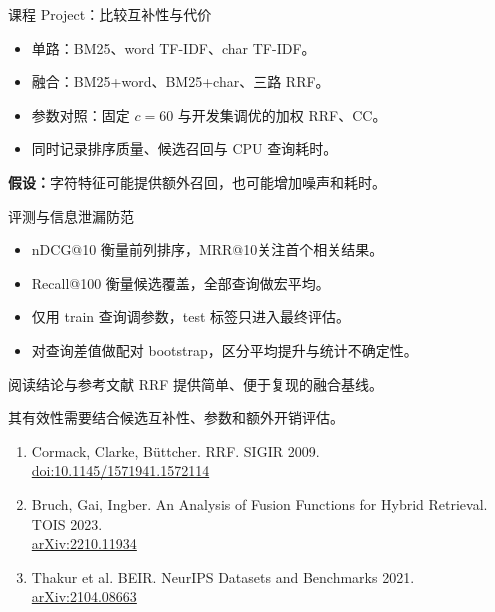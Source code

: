 \documentclass[aspectratio=169,11pt]{beamer}
\begin{document}
\begin{frame}{课程 Project：比较互补性与代价}
\begin{itemize}\setlength\itemsep{0.75em}
\item 单路：BM25、word TF-IDF、char TF-IDF。
\item 融合：BM25+word、BM25+char、三路 RRF。
\item 参数对照：固定 $c=60$ 与开发集调优的加权 RRF、CC。
\item 同时记录排序质量、候选召回与 CPU 查询耗时。
\end{itemize}
\vfill
\textbf{假设：}字符特征可能提供额外召回，也可能增加噪声和耗时。
\end{frame}

\begin{frame}{评测与信息泄漏防范}
\begin{itemize}\setlength\itemsep{0.75em}
\item nDCG@10 衡量前列排序，MRR@10关注首个相关结果。
\item Recall@100 衡量候选覆盖，全部查询做宏平均。
\item 仅用 train 查询调参数，test 标签只进入最终评估。
\item 对查询差值做配对 bootstrap，区分平均提升与统计不确定性。
\end{itemize}
\end{frame}

\begin{frame}{阅读结论与参考文献}
RRF 提供简单、便于复现的融合基线。\par\medskip
其有效性需要结合候选互补性、参数和额外开销评估。
\vfill
\footnotesize
\begin{enumerate}
\item Cormack, Clarke, Büttcher. RRF. SIGIR 2009.\\
\href{https://doi.org/10.1145/1571941.1572114}{doi:10.1145/1571941.1572114}
\item Bruch, Gai, Ingber. An Analysis of Fusion Functions for Hybrid Retrieval. TOIS 2023.\\
\href{https://arxiv.org/abs/2210.11934}{arXiv:2210.11934}
\item Thakur et al. BEIR. NeurIPS Datasets and Benchmarks 2021.\\
\href{https://arxiv.org/abs/2104.08663}{arXiv:2104.08663}
\end{enumerate}
\end{frame}
\end{document}

